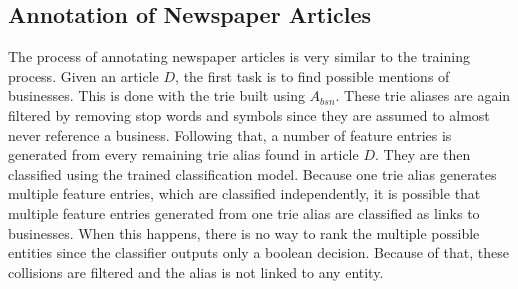 \subsection{Annotation of Newspaper Articles}
The process of annotating newspaper articles is very similar to the training process. Given an article $D$, the first task is to find possible mentions of businesses. This is done with the trie built using $A_{bsn}$. These trie aliases are again filtered by removing stop words and symbols since they are assumed to almost never reference a business. Following that, a number of feature entries is generated from every remaining trie alias found in article $D$. They are then classified using the trained classification model. Because one trie alias generates multiple feature entries, which are classified independently, it is possible that multiple feature entries generated from one trie alias are classified as links to businesses. When this happens, there is no way to rank the multiple possible entities since the classifier outputs only a boolean decision. Because of that, these collisions are filtered and the alias is not linked to any entity.
